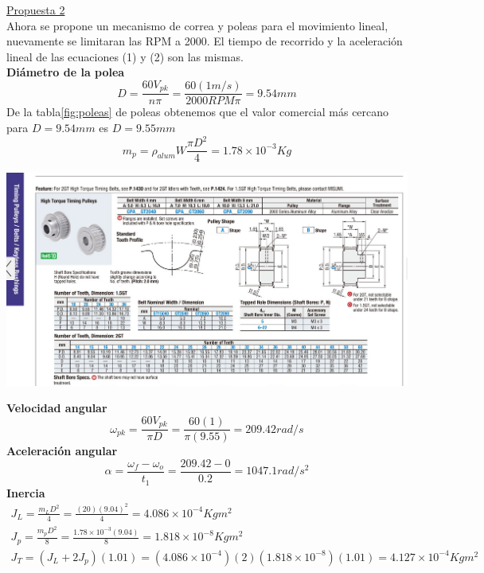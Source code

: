 \underline{Propuesta 2}
\\Ahora se propone un mecanismo de correa y poleas para el movimiento lineal, nuevamente se limitaran las RPM a 2000. El tiempo de recorrido y la aceleración lineal de las ecuaciones (1) y (2) son las mismas.
\\
\newline
\textbf{Diámetro de la polea}
\begin{equation}
    D=\frac{60V_{pk}}{n\pi}=\frac{60(1m/s)}{2000RPM\pi}=9.54mm
\end{equation}
De la tabla\ref{fig:poleas} de poleas obtenemos que el valor comercial más cercano para $D=9.54mm$ es $D=9.55mm$
\begin{equation}
    m_p = \rho_{alum}W\frac{\pi D^2}{4}=1.78\times 10^{-3}Kg
\end{equation}
\begin{center}
    \includegraphics[scale=0.4]{imagenes/catalogo poleas.png}
    \label{fig:poleas}
\end{center}
\textbf{Velocidad angular}
\begin{equation}
    \omega_{pk}=\frac{60V_{pk}}{\pi D}=\frac{60(1)}{\pi (9.55)} = 209.42rad/s
\end{equation}
\textbf{Aceleración angular}
\begin{equation}
    \alpha = \frac{\omega_f-\omega_o}{t_1}=\frac{209.42-0}{0.2}=1047.1rad/s^2
\end{equation}
\textbf{Inercia}
\begin{align}
    J_{L}=\frac{m_LD^2}{4}=\frac{(20)(9.04)^2}{4}=4.086\times 10^{-4}Kgm^2 \\
    J_p = \frac{m_pD^2}{8}=\frac{1.78\times 10^{-3}(9.04)}{8} = 1.818\times 10^{-8}Kgm^2 \\
    J_T = (J_L+2J_p)(1.01)=(4.086\times 10^{-4})(2)(1.818\times 10^{-8})(1.01)=4.127\times 10^{-4}Kgm^2
\end{align}
